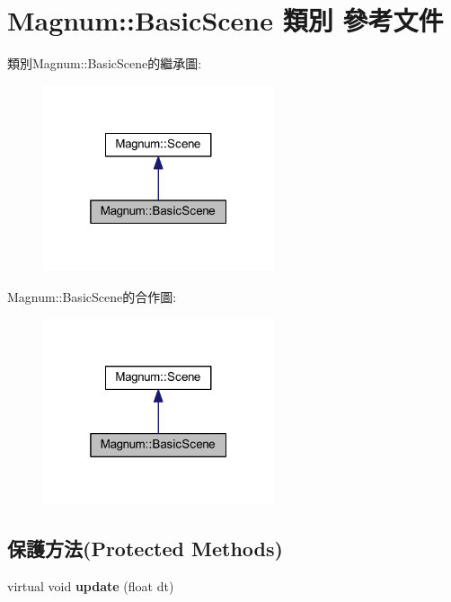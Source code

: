 \hypertarget{class_magnum_1_1_basic_scene}{}\section{Magnum\+:\+:Basic\+Scene 類別 參考文件}
\label{class_magnum_1_1_basic_scene}


類別\+Magnum\+:\+:Basic\+Scene的繼承圖\+:\nopagebreak
\begin{figure}[H]
\begin{center}
\leavevmode
\includegraphics[width=193pt]{class_magnum_1_1_basic_scene__inherit__graph}
\end{center}
\end{figure}


Magnum\+:\+:Basic\+Scene的合作圖\+:\nopagebreak
\begin{figure}[H]
\begin{center}
\leavevmode
\includegraphics[width=193pt]{class_magnum_1_1_basic_scene__coll__graph}
\end{center}
\end{figure}
\subsection*{保護方法(Protected Methods)}
\begin{DoxyCompactItemize}
\item 
virtual void {\bfseries update} (float dt)\hypertarget{class_magnum_1_1_basic_scene_a382ad979e86dba40181b6ca906b99315}{}\label{class_magnum_1_1_basic_scene_a382ad979e86dba40181b6ca906b99315}

\end{DoxyCompactItemize}
